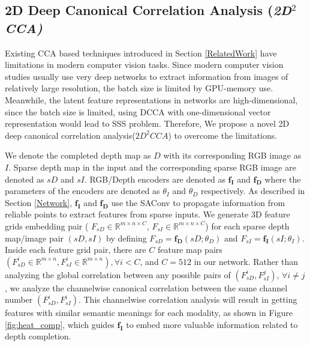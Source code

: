 \documentclass{article}
\begin{document}
\subsection{2D Deep Canonical Correlation Analysis (\textit{2D$^2$CCA)}}
\label{2D2CCA}
Existing CCA based techniques introduced in Section \ref{RelatedWork} have limitations in modern computer vision tasks. Since modern computer vision studies usually use very deep networks to extract information from images of relatively large resolution, the batch size is limited by GPU-memory use. Meanwhile, the latent feature representations in networks are high-dimensional, since the batch size is limited, using DCCA with one-dimensional vector representation would lead to SSS problem. Therefore, We propose a novel 2D deep canonical correlation analysis($2D^2 CCA$) to overcome the limitations.

We denote the completed depth map as $\mathit{D}$ with its corresponding RGB image as $\mathit{I}$. Sparse depth map in the input and the corresponding sparse RGB image are denoted as $\mathit{sD}$ and $\mathit{sI}$. RGB/Depth encoders are denoted as $\boldsymbol{f_{I}}$ and $\boldsymbol{f_{D}}$ where the parameters of the encoders are denoted as $\theta_{I}$ and $\theta_{D}$ respectively. As described in Section \ref{Network}, $\boldsymbol{f_{I}}$ and $\boldsymbol{f_{D}}$ use the SAConv to propagate information from reliable points to extract features from sparse inputs. We generate 3D feature grids embedding pair ( $\mathit{F_{sD}}\in \mathit{\mathbb{R}^{m\times n\times C }} $, $\mathit{F_{sI}}\in \mathit{\mathbb{R}^{m\times n\times C }} $) for each sparse depth map/image pair $\left(\mathit{sD},\mathit{sI}\right )$ by defining $\mathit{F_{sD}} = \boldsymbol{ f_{D}}\left(\mathit{sD} ;  \theta_{D}\right)$ and $\mathit{F_{sI}} = \boldsymbol{ f_{I}}\left(\mathit{sI} ;  \theta_{I}\right)$. Inside each feature grid pair, there are $\mathit{C}$ feature map pairs $\left( \mathit{F^{i}_{sD}}\in \mathit{\mathbb{R}^{m\times n}}, \mathit{F^{i}_{sI}}\in \mathit{\mathbb{R}^{m\times n}}\right ), \forall i < C$, and $C = 512$ in our network. Rather than analyzing the global correlation between any possible pairs of $(\mathit{F^{i}_{sD}},\mathit{F^{j}_{sI}})$, $\forall i \neq j$, we analyze the channelwise canonical correlation between the same channel number $\left(\mathit{F^{i}_{sD}},\mathit{F^{i}_{sI}}\right )$. This channelwise correlation analysis will result in getting features with similar semantic meanings for each modality, as shown in Figure \ref{fig:heat_comp}, which guides $\boldsymbol{f_{I}}$ to embed more valuable information related to depth completion.
\end{document}
